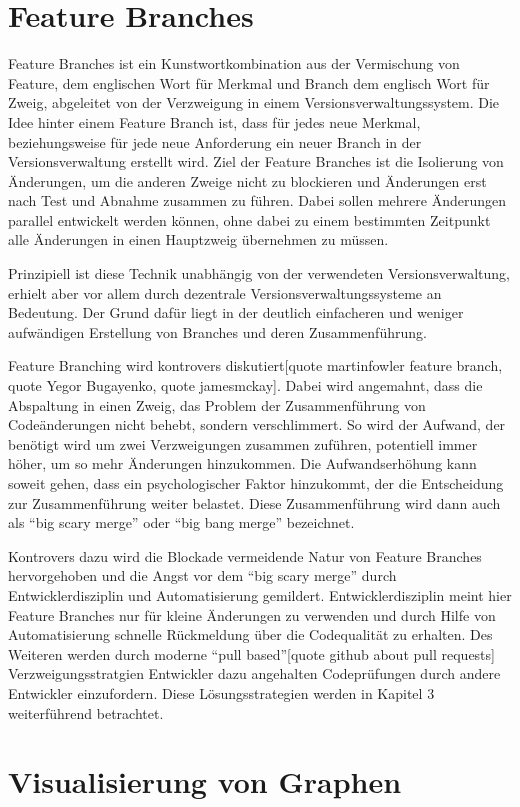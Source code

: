 \section{Feature Branches}

Feature Branches ist ein Kunstwortkombination aus der Vermischung von Feature, dem englischen Wort für Merkmal und Branch dem englisch Wort für Zweig, abgeleitet von der Verzweigung in einem Versionsverwaltungssystem. Die Idee hinter einem Feature Branch ist, dass für jedes neue Merkmal, beziehungsweise für jede neue Anforderung ein neuer Branch in der Versionsverwaltung erstellt wird. Ziel der Feature Branches ist die Isolierung von Änderungen, um die anderen Zweige nicht zu blockieren und Änderungen erst nach Test und Abnahme zusammen zu führen. Dabei sollen mehrere Änderungen parallel entwickelt werden können, ohne dabei zu einem bestimmten Zeitpunkt alle Änderungen in einen Hauptzweig übernehmen zu müssen.

Prinzipiell ist diese Technik unabhängig von der verwendeten Versionsverwaltung, erhielt aber vor allem durch dezentrale Versionsverwaltungssysteme an Bedeutung. Der Grund dafür liegt in der deutlich einfacheren und weniger aufwändigen Erstellung von Branches und deren Zusammenführung.

Feature Branching wird kontrovers diskutiert[quote martinfowler feature branch, quote Yegor Bugayenko, quote jamesmckay]. Dabei wird angemahnt, dass die Abspaltung in einen Zweig, das Problem der Zusammenführung von Codeänderungen nicht behebt, sondern verschlimmert. So wird der Aufwand, der benötigt wird um zwei Verzweigungen zusammen zuführen, potentiell immer höher, um so mehr Änderungen hinzukommen. Die Aufwandserhöhung kann soweit gehen, dass ein psychologischer Faktor hinzukommt, der die Entscheidung zur Zusammenführung weiter belastet. Diese Zusammenführung wird dann auch als ``big scary merge'' oder ``big bang merge'' bezeichnet.

Kontrovers dazu wird die Blockade vermeidende Natur von Feature Branches hervorgehoben und die Angst vor dem ``big scary merge'' durch Entwicklerdisziplin und Automatisierung gemildert. Entwicklerdisziplin meint hier Feature Branches nur für kleine Änderungen zu verwenden und durch Hilfe von Automatisierung schnelle Rückmeldung über die Codequalität zu erhalten. Des Weiteren werden durch moderne ``pull based''[quote github about pull requests] Verzweigungsstratgien Entwickler dazu angehalten Codeprüfungen durch andere Entwickler einzufordern. Diese Lösungsstrategien werden in Kapitel 3 weiterführend betrachtet.

\section{Visualisierung von Graphen}